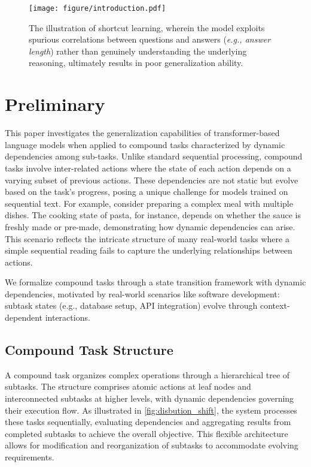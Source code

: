 \begin{figure}
    \centering
    \texttt{[image: figure/introduction.pdf]}
    \caption{The illustration of shortcut learning, wherein the model exploits spurious correlations between questions and answers (\emph{e.g., answer length}) rather than genuinely understanding the underlying reasoning, ultimately results in poor generalization ability.}
    \label{fig:introduction}
\end{figure}
\section{Preliminary}
This paper investigates the generalization capabilities of transformer-based language models when applied to compound tasks characterized by dynamic dependencies among sub-tasks. Unlike standard sequential processing, compound tasks involve inter-related actions where the state of each action depends on a varying subset of previous actions. These dependencies are not static but evolve based on the task's progress, posing a unique challenge for models trained on sequential text. For example, consider preparing a complex meal with multiple dishes. The cooking state of pasta, for instance, depends on whether the sauce is freshly made or pre-made, demonstrating how dynamic dependencies can arise. This scenario reflects the intricate structure of many real-world tasks where a simple sequential reading fails to capture the underlying relationships between actions.

We formalize compound tasks through a state transition framework with dynamic dependencies, motivated by real-world scenarios like software development: subtask states (e.g., database setup, API integration) evolve through context-dependent interactions.
\subsection{Compound Task Structure}  
A compound task organizes complex operations through a hierarchical tree of subtasks. The structure comprises atomic actions at leaf nodes and interconnected subtasks at higher levels, with dynamic dependencies governing their execution flow. As illustrated in \ref{fig:disbution_shift}, the system processes these tasks sequentially, evaluating dependencies and aggregating results from completed subtasks to achieve the overall objective. This flexible architecture allows for modification and reorganization of subtasks to accommodate evolving requirements.


